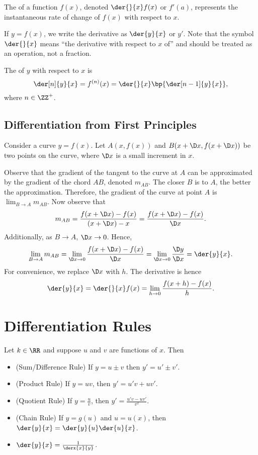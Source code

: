 \begin{definition}
    The  of a function $f(x)$, denoted $\der{}{x} f(x)$ or $f'(a)$, represents the instantaneous rate of change of $f(x)$ with respect to $x$.
\end{definition}

If $y = f(x)$, we write the derivative as $\der{y}{x}$ or $y'$. Note that the symbol $\der{}{x}$ means ``the derivative with respect to $x$ of'' and should be treated as an operation, not a fraction.

\begin{definition}
    The  of $y$ with respect to $x$ is \[\der[n]{y}{x} = f^{(n)}(x) = \der{}{x} \bp{\der[n-1]{y}{x}},\] where $n \in \ZZ^+$.
\end{definition}

\subsection{Differentiation from First Principles}

Consider a curve $y = f(x)$. Let $A(x, f(x))$ and $B(x + \D x, f(x + \D x))$ be two points on the curve, where $\D x$ is a small increment in $x$.

Observe that the gradient of the tangent to the curve at $A$ can be approximated by the gradient of the chord $AB$, denoted $m_{AB}$. The closer $B$ is to $A$, the better the approximation. Therefore, the gradient of the curve at point $A$ is $\lim_{B \to A} m_{AB}$. Now observe that \[m_{AB} = \frac{f(x + \D x) - f(x)}{(x + \D x) - x} = \frac{f(x + \D x) - f(x)}{\D x}.\] Additionally, as $B \to A$, $\D x \to 0$. Hence, \[\lim_{B \to A} m_{AB} = \lim_{\D x \to 0} \frac{f(x + \D x) - f(x)}{\D x} = \lim_{\D x \to 0} \frac{\D y}{\D x} = \der{y}{x}.\] For convenience, we replace $\D x$ with $h$. The derivative is hence \[\der{y}{x} = \der{}{x} f(x) = \lim_{h \to 0} \frac{f(x+h) - f(x)}{h}.\]

\section{Differentiation Rules}

\begin{fact}
    Let $k \in \RR$ and suppose $u$ and $v$ are functions of $x$. Then
    \begin{itemize}
        \item (Sum/Difference Rule) If $y = u \pm v$ then $y' = u' \pm v'$.
        \item (Product Rule) If $y = uv$, then $y' = u' v + u v'$.
        \item (Quotient Rule) If $y = \frac{u}{v}$, then $y' = \frac{u' v - u v'}{v^2}$.
        \item (Chain Rule) If $y = g(u)$ and $u = u(x)$, then $\der{y}{x} = \der{y}{u} \der{u}{x}$.
        \item $\der{y}{x} = \frac1{\derx{x}{y}}$.
    \end{itemize}
\end{fact}

